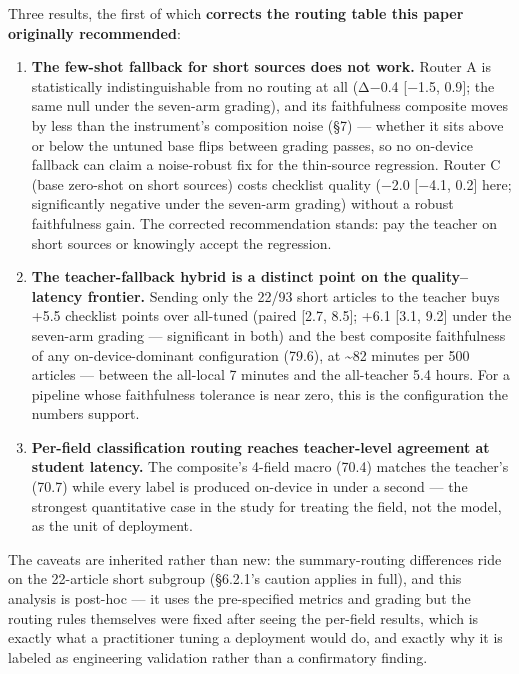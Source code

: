 \documentclass[11pt]{article}
\providecommand{\tightlist}{\setlength{\itemsep}{0pt}\setlength{\parskip}{0pt}}
\providecommand{\tightlist}{%
  \setlength{\itemsep}{0pt}\setlength{\parskip}{0pt}}
\begin{document}
Three results, the first of which \textbf{corrects the routing table
this paper originally recommended}:

\begin{enumerate}
\def\labelenumi{\arabic{enumi}.}
\tightlist
\item
  \textbf{The few-shot fallback for short sources does not work.} Router
  A is statistically indistinguishable from no routing at all (Δ−0.4
  {[}−1.5, 0.9{]}; the same null under the seven-arm grading), and its
  faithfulness composite moves by less than the instrument's composition
  noise (§7) --- whether it sits above or below the untuned base flips
  between grading passes, so no on-device fallback can claim a
  noise-robust fix for the thin-source regression. Router C (base
  zero-shot on short sources) costs checklist quality (−2.0 {[}−4.1,
  0.2{]} here; significantly negative under the seven-arm grading)
  without a robust faithfulness gain. The corrected recommendation
  stands: pay the teacher on short sources or knowingly accept the
  regression.
\item
  \textbf{The teacher-fallback hybrid is a distinct point on the
  quality--latency frontier.} Sending only the 22/93 short articles to
  the teacher buys +5.5 checklist points over all-tuned (paired {[}2.7,
  8.5{]}; +6.1 {[}3.1, 9.2{]} under the seven-arm grading ---
  significant in both) and the best composite faithfulness of any
  on-device-dominant configuration (79.6), at \textasciitilde82 minutes
  per 500 articles --- between the all-local 7 minutes and the
  all-teacher 5.4 hours. For a pipeline whose faithfulness tolerance is
  near zero, this is the configuration the numbers support.
\item
  \textbf{Per-field classification routing reaches teacher-level
  agreement at student latency.} The composite's 4-field macro (70.4)
  matches the teacher's (70.7) while every label is produced on-device
  in under a second --- the strongest quantitative case in the study for
  treating the field, not the model, as the unit of deployment.
\end{enumerate}

The caveats are inherited rather than new: the summary-routing
differences ride on the 22-article short subgroup (§6.2.1's caution
applies in full), and this analysis is post-hoc --- it uses the
pre-specified metrics and grading but the routing rules themselves were
fixed after seeing the per-field results, which is exactly what a
practitioner tuning a deployment would do, and exactly why it is labeled
as engineering validation rather than a confirmatory finding.
\end{document}
